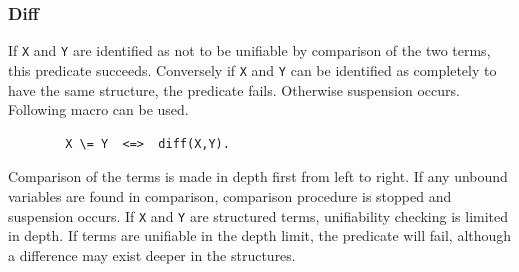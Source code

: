 \subsubsection{Diff}
\begin{itemize}

If \verb|X| and \verb|Y| are identified as not to be unifiable 
by comparison of the two terms, this predicate succeeds.
Conversely if \verb|X| and \verb|Y| can be identified as
completely to have the same structure, the predicate fails.
Otherwise suspension occurs. Following macro can be used.
\begin{verbatim}
        X \= Y  <=>  diff(X,Y).
\end{verbatim}
\Caution Comparison of the terms is made in depth first from left to right.
If any unbound variables are found in comparison,
comparison procedure is stopped and suspension occurs.
If \verb|X| and \verb|Y| are structured terms, unifiability checking is
limited in depth. If terms are unifiable in the depth limit,
the predicate will fail, although a difference may exist deeper 
in the structures.

\index{\verb|\=|}
\end{itemize}
